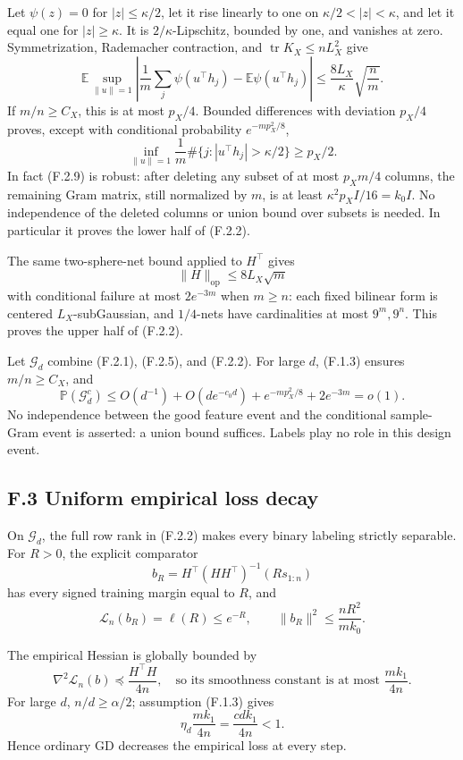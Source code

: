 \documentclass[
  11pt,
  a4paper,
]{article}
\begin{document}
Let \(\psi(z)=0\) for \(|z|\le\kappa/2\), let it rise linearly to one on
\(\kappa/2<|z|<\kappa\), and let it equal one for \(|z|\ge\kappa\). It
is \(2/\kappa\)-Lipschitz, bounded by one, and vanishes at zero.
Symmetrization, Rademacher contraction, and
\(\operatorname{tr}K_X\le nL_X^2\) give \[
\mathbb E\sup_{\|u\|=1}\left|
\frac1m\sum_j\psi(u^\top h_j)-\mathbb E\psi(u^\top h_j)
\right|
\le\frac{8L_X}{\kappa}\sqrt{\frac nm}.
\tag{F.2.8}
\] If \(m/n\ge C_X\), this is at most \(p_X/4\). Bounded differences
with deviation \(p_X/4\) proves, except with conditional probability
\(e^{-mp_X^2/8}\), \[
\inf_{\|u\|=1}\frac1m\#\{j:|u^\top h_j|>\kappa/2\}\ge p_X/2.
\tag{F.2.9}
\] In fact (F.2.9) is robust: after deleting any subset of at most
\(p_Xm/4\) columns, the remaining Gram matrix, still normalized by
\(m\), is at least \(\kappa^2p_XI/16=k_0I\). No independence of the
deleted columns or union bound over subsets is needed. In particular it
proves the lower half of (F.2.2).

The same two-sphere-net bound applied to \(H^\top\) gives \[
\|H\|_{\mathrm{op}}\le8L_X\sqrt m
\tag{F.2.10}
\] with conditional failure at most \(2e^{-3m}\) when \(m\ge n\): each
fixed bilinear form is centered \(L_X\)-subGaussian, and \(1/4\)-nets
have cardinalities at most \(9^m,9^n\). This proves the upper half of
(F.2.2).

Let \(\mathcal G_d\) combine (F.2.1), (F.2.5), and (F.2.2). For large
\(d\), (F.1.3) ensures \(m/n\ge C_X\), and \[
\mathbb P(\mathcal G_d^c)
\le O(d^{-1})+O(de^{-c_0d})+e^{-mp_X^2/8}+2e^{-3m}=o(1).
\tag{F.2.11}
\] No independence between the good feature event and the conditional
sample-Gram event is asserted: a union bound suffices. Labels play no
role in this design event.

\hypertarget{f.3-uniform-empirical-loss-decay}{%
\subsection{F.3 Uniform empirical loss
decay}\label{f.3-uniform-empirical-loss-decay}}

On \(\mathcal G_d\), the full row rank in (F.2.2) makes every binary
labeling strictly separable. For \(R>0\), the explicit comparator \[
b_R=H^\top(HH^\top)^{-1}(R s_{1:n})
\tag{F.3.1}
\] has every signed training margin equal to \(R\), and \[
\mathcal L_n(b_R)=\ell(R)\le e^{-R},\qquad
\|b_R\|^2\le\frac{nR^2}{mk_0}.
\tag{F.3.2}
\]

The empirical Hessian is globally bounded by \[
\nabla^2\mathcal L_n(b)\preceq\frac{H^\top H}{4n},
\quad\text{so its smoothness constant is at most }\frac{mk_1}{4n}.
\] For large \(d\), \(n/d\ge\alpha/2\); assumption (F.1.3) gives \[
\eta_d\frac{mk_1}{4n}=\frac{cdk_1}{4n}<1.
\tag{F.3.3}
\] Hence ordinary GD decreases the empirical loss at every step.
\end{document}
